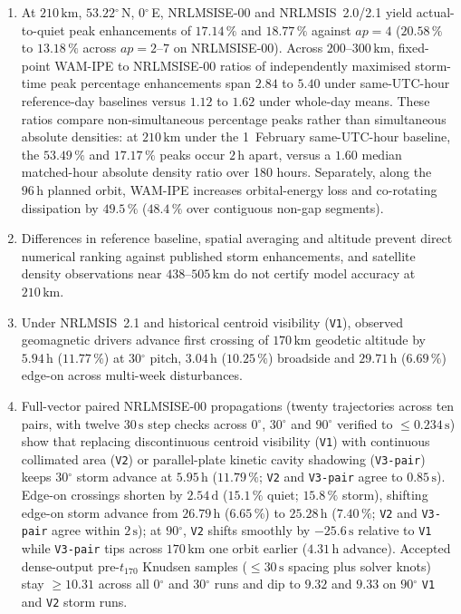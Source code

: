 \documentclass[12pt]{article}
\newcommand{\unit}[1]{\,\mathrm{#1}}
\newcommand{\degree}{\ensuremath{{}^\circ}}
\begin{document}
\begin{enumerate}
\item At $210\unit{km}$, $53.22\degree$\,N, $0\degree$\,E, NRLMSISE-00 and NRLMSIS~2.0/2.1 yield actual-to-quiet peak enhancements of $17.14\,\%$ and $18.77\,\%$ against $ap=4$ ($20.58\,\%$ to $13.18\,\%$ across $ap=2$--$7$ on NRLMSISE-00). Across $200$--$300\unit{km}$, fixed-point WAM-IPE to NRLMSISE-00 ratios of independently maximised storm-time peak percentage enhancements span $2.84$ to $5.40$ under same-UTC-hour reference-day baselines versus $1.12$ to $1.62$ under whole-day means. These ratios compare non-simultaneous percentage peaks rather than simultaneous absolute densities: at $210\unit{km}$ under the 1~February same-UTC-hour baseline, the $53.49\,\%$ and $17.17\,\%$ peaks occur $2\unit{h}$ apart, versus a $1.60$ median matched-hour absolute density ratio over 180 hours. Separately, along the $96\unit{h}$ planned orbit, WAM-IPE increases orbital-energy loss and co-rotating dissipation by $49.5\,\%$ ($48.4\,\%$ over contiguous non-gap segments).

\item Differences in reference baseline, spatial averaging and altitude prevent direct numerical ranking against published storm enhancements, and satellite density observations near $438$--$505\unit{km}$ do not certify model accuracy at $210\unit{km}$.

\item Under NRLMSIS~2.1 and historical centroid visibility (\texttt{V1}), observed geomagnetic drivers advance first crossing of $170\unit{km}$ geodetic altitude by $5.94\unit{h}$ ($11.77\,\%$) at $30\degree$ pitch, $3.04\unit{h}$ ($10.25\,\%$) broadside and $29.71\unit{h}$ ($6.69\,\%$) edge-on across multi-week disturbances.

\item Full-vector paired NRLMSISE-00 propagations (twenty trajectories across ten pairs, with twelve $30\unit{s}$ step checks across $0\degree$, $30\degree$ and $90\degree$ verified to $\le 0.234\unit{s}$) show that replacing discontinuous centroid visibility (\texttt{V1}) with continuous collimated area (\texttt{V2}) or parallel-plate kinetic cavity shadowing (\texttt{V3-pair}) keeps $30\degree$ storm advance at $5.95\unit{h}$ ($11.79\,\%$; \texttt{V2} and \texttt{V3-pair} agree to $0.85\unit{s}$). Edge-on crossings shorten by $2.54\unit{d}$ ($15.1\,\%$ quiet; $15.8\,\%$ storm), shifting edge-on storm advance from $26.79\unit{h}$ ($6.65\,\%$) to $25.28\unit{h}$ ($7.40\,\%$; \texttt{V2} and \texttt{V3-pair} agree within $2\unit{s}$); at $90\degree$, \texttt{V2} shifts smoothly by $-25.6\unit{s}$ relative to \texttt{V1} while \texttt{V3-pair} tips across $170\unit{km}$ one orbit earlier ($4.31\unit{h}$ advance). Accepted dense-output pre-$t_{170}$ Knudsen samples ($\le 30\unit{s}$ spacing plus solver knots) stay $\ge 10.31$ across all $0\degree$ and $30\degree$ runs and dip to $9.32$ and $9.33$ on $90\degree$ \texttt{V1} and \texttt{V2} storm runs.
\end{enumerate}
\end{document}
